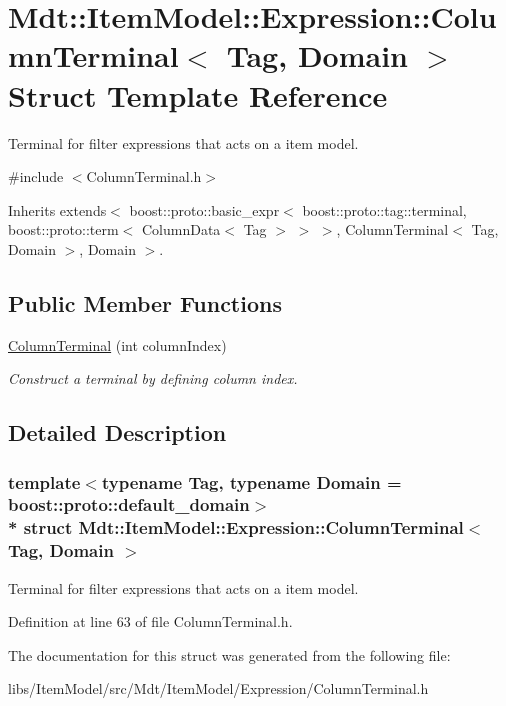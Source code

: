 \hypertarget{struct_mdt_1_1_item_model_1_1_expression_1_1_column_terminal}{}\section{Mdt\+:\+:Item\+Model\+:\+:Expression\+:\+:Column\+Terminal$<$ Tag, Domain $>$ Struct Template Reference}
\label{struct_mdt_1_1_item_model_1_1_expression_1_1_column_terminal}


Terminal for filter expressions that acts on a item model.  




{\ttfamily \#include $<$Column\+Terminal.\+h$>$}



Inherits extends$<$ boost\+::proto\+::basic\+\_\+expr$<$ boost\+::proto\+::tag\+::terminal, boost\+::proto\+::term$<$ Column\+Data$<$ Tag $>$ $>$ $>$, Column\+Terminal$<$ Tag, Domain $>$, Domain $>$.

\subsection*{Public Member Functions}
\begin{DoxyCompactItemize}
\item 
\hyperlink{struct_mdt_1_1_item_model_1_1_expression_1_1_column_terminal_a3f6abfc91f717b5e462fa4a2e769f5c9}{Column\+Terminal} (int column\+Index)\hypertarget{struct_mdt_1_1_item_model_1_1_expression_1_1_column_terminal_a3f6abfc91f717b5e462fa4a2e769f5c9}{}\label{struct_mdt_1_1_item_model_1_1_expression_1_1_column_terminal_a3f6abfc91f717b5e462fa4a2e769f5c9}

\begin{DoxyCompactList}\small\item\em Construct a terminal by defining column index. \end{DoxyCompactList}\end{DoxyCompactItemize}


\subsection{Detailed Description}
\subsubsection*{template$<$typename Tag, typename Domain = boost\+::proto\+::default\+\_\+domain$>$\\*
struct Mdt\+::\+Item\+Model\+::\+Expression\+::\+Column\+Terminal$<$ Tag, Domain $>$}

Terminal for filter expressions that acts on a item model. 

Definition at line 63 of file Column\+Terminal.\+h.



The documentation for this struct was generated from the following file\+:\begin{DoxyCompactItemize}
\item 
libs/\+Item\+Model/src/\+Mdt/\+Item\+Model/\+Expression/Column\+Terminal.\+h\end{DoxyCompactItemize}
